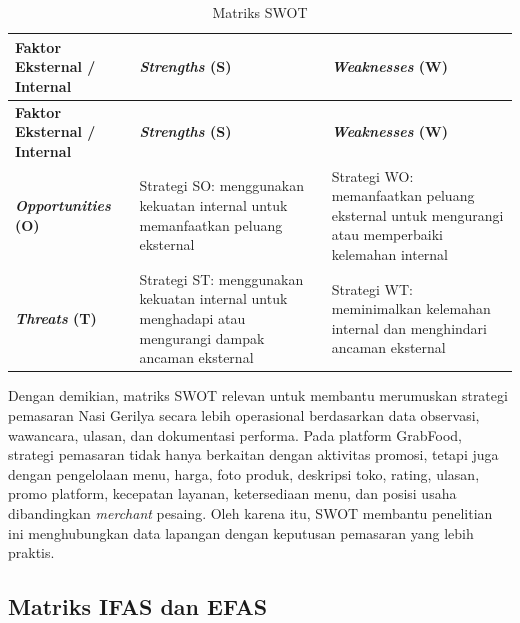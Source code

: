 \begingroup
    \small
    \begin{xltabular}{\textwidth}{|Z{2.9cm}|Y|Y|}
        \caption{Matriks SWOT}
        \label{tab:matriks-swot-teoretis}\\
        \toprule
        \textbf{Faktor Eksternal / Internal} & \textbf{\textit{Strengths} (S)}                                                                      & \textbf{\textit{Weaknesses} (W)}                                                                 \\ \hline
        \midrule
        \endfirsthead
        \toprule
        \textbf{Faktor Eksternal / Internal} & \textbf{\textit{Strengths} (S)}                                                                      & \textbf{\textit{Weaknesses} (W)}                                                                 \\ \hline
        \midrule
        \endhead
        \endfoot
        \bottomrule
        \endlastfoot
        \textbf{\textit{Opportunities} (O)}  & Strategi SO: menggunakan kekuatan internal untuk memanfaatkan peluang eksternal                      & Strategi WO: memanfaatkan peluang eksternal untuk mengurangi atau memperbaiki kelemahan internal \\ \hline
        \textbf{\textit{Threats} (T)}        & Strategi ST: menggunakan kekuatan internal untuk menghadapi atau mengurangi dampak ancaman eksternal & Strategi WT: meminimalkan kelemahan internal dan menghindari ancaman eksternal                   \\ \hline
    \end{xltabular}
\endgroup

Dengan demikian, matriks SWOT relevan untuk membantu merumuskan strategi pemasaran Nasi Gerilya secara lebih operasional berdasarkan data observasi, wawancara, ulasan, dan dokumentasi performa. Pada platform GrabFood, strategi pemasaran tidak hanya berkaitan dengan aktivitas promosi, tetapi juga dengan pengelolaan menu, harga, foto produk, deskripsi toko, rating, ulasan, promo platform, kecepatan layanan, ketersediaan menu, dan posisi usaha dibandingkan \textit{merchant} pesaing. Oleh karena itu, SWOT membantu penelitian ini menghubungkan data lapangan dengan keputusan pemasaran yang lebih praktis.

\subsection{Matriks IFAS dan EFAS}

